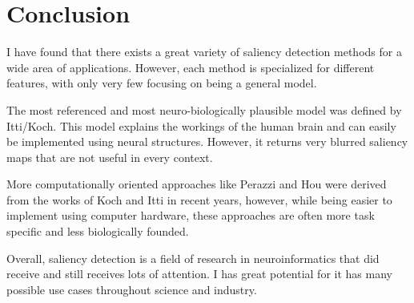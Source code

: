 \documentclass[a4paper,12pt,fleqn,oneside]{scrartcl}
\begin{document}
\newpage
\section{Conclusion}

I have found that there exists a great variety of saliency detection methods for a wide area of applications. However,
each method is specialized for different features, with only very few focusing on being a general model.

The most referenced and most neuro-biologically plausible model was defined by Itti/Koch. This model explains the workings
of the human brain and can easily be implemented using neural structures. However, it returns very blurred saliency maps
that are not useful in every context.

More computationally oriented approaches like Perazzi and Hou were derived from the works of Koch and Itti in recent years,
however, while being easier to implement using computer hardware, these approaches are often more task specific and
less biologically founded.

Overall, saliency detection is a field of research in neuroinformatics that did receive and still receives lots of
attention. I has great potential for it has many possible use cases throughout science and industry.


\newpage
\nocite{*}



\listoffigures

\listoftables
\end{document}
